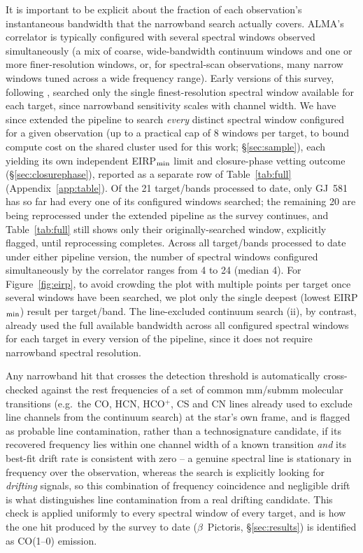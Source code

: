 \documentclass{openjournal}
\begin{document}
It is important to be explicit about the fraction of each observation's
instantaneous bandwidth that the narrowband search actually covers.
ALMA's correlator is typically configured with several spectral windows
observed simultaneously (a mix of coarse, wide-bandwidth continuum
windows and one or more finer-resolution windows, or, for spectral-scan
observations, many narrow windows tuned across a wide frequency range).
Early versions of this survey, following \citet{Mason2024}, searched
only the single finest-resolution spectral window available for each
target, since narrowband sensitivity scales with channel width. We have
since extended the pipeline to search \emph{every} distinct spectral
window configured for a given observation (up to a practical cap of 8
windows per target, to bound compute cost on the shared cluster used for
this work; \S\ref{sec:sample}), each yielding its own independent
EIRP$_{\rm min}$ limit and closure-phase vetting outcome
(\S\ref{sec:closurephase}), reported as a separate row of
Table~\ref{tab:full} (Appendix~\ref{app:table}). Of the 21 target/bands
processed to date, only GJ~581 has so far had every one of its
configured windows searched; the remaining 20 are being reprocessed
under the extended pipeline as the survey continues, and
Table~\ref{tab:full} still shows only their originally-searched window,
explicitly flagged, until reprocessing completes. Across all target/bands
processed to date under either pipeline version, the number of spectral
windows configured simultaneously by the correlator ranges from 4 to 24
(median 4). For Figure~\ref{fig:eirp}, to avoid crowding the plot with
multiple points per target once several windows have been searched, we
plot only the single deepest (lowest EIRP$_{\rm min}$) result per
target/band. The line-excluded continuum search (ii), by contrast,
already used the full available bandwidth across all configured spectral
windows for each target in every version of the pipeline, since it does
not require narrowband spectral resolution.

Any narrowband hit that crosses the detection threshold is automatically
cross-checked against the rest frequencies of a set of common mm/submm
molecular transitions (e.g.\ the CO, HCN, HCO$^{+}$, CS and CN lines
already used to exclude line channels from the continuum search) at the
star's own frame, and is flagged as probable line contamination, rather
than a technosignature candidate, if its recovered frequency lies within
one channel width of a known transition \emph{and} its best-fit drift
rate is consistent with zero -- a genuine spectral line is stationary in
frequency over the observation, whereas the search is explicitly looking
for \emph{drifting} signals, so this combination of frequency
coincidence and negligible drift is what distinguishes line
contamination from a real drifting candidate. This check is applied
uniformly to every spectral window of every target, and is how the one
hit produced by the survey to date ($\beta$~Pictoris, \S\ref{sec:results})
is identified as CO(1--0) emission.
\end{document}
